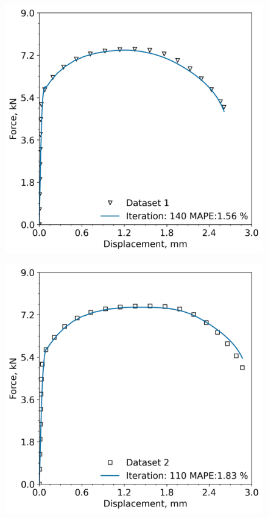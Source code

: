 \documentclass[preprint, review, 12pt]{elsarticle}
\begin{document}
{	%
	\begin{figure}[!htbp]
		\begin{minipage}[b]{0.5\linewidth}
			\centering
			\includegraphics[width=\textwidth, height=0.45\textheight, keepaspectratio]{P91_20_2_FASTEST_ITERATION}
			\label{fig:dataset1}
		\end{minipage}
	\hspace{0.2cm}
		\begin{minipage}[b]{0.5\linewidth}
			\centering
			\includegraphics[width=\textwidth, height=0.45\textheight, keepaspectratio]{P91_20_1_FASTEST_ITERATION}

\end{minipage}
\end{figure}}
\end{document}
